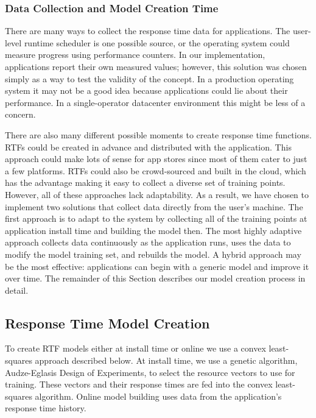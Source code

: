 %
%
%


\subsubsection*{Data Collection and Model Creation Time}
There are many ways to collect the response time data for
applications. The user-level runtime scheduler is one possible source,
or the operating system could measure progress using performance
counters.  In our implementation, applications report their own
measured values; however, this solution was chosen simply as a way to
test the validity of the concept.  In a production operating system it
may not be a good idea because applications could lie about their
performance.  In a single-operator datacenter environment this might be less of a concern.

There are also many different possible moments to create response time functions.  RTFs could be created in advance and distributed with the application. This approach could make lots of sense for app stores since most of them cater to just a few platforms. RTFs could also be crowd-sourced and built in the cloud, which has the advantage making it easy to collect a diverse set of training points.  However, all of these approaches lack adaptability.  As a result, we have chosen to implement two solutions that collect data directly from the user's machine.  The first approach is to adapt to the system by collecting all of the training points at application install time and building the model then.  The most highly adaptive approach collects data continuously as the application runs, uses the data to modify the model training set, and rebuilds the model.  A hybrid approach may be the most effective: applications can begin with a generic model and improve it over time. The remainder of this Section describes our model creation process in detail.
\subsection{Response Time Model Creation}
To create RTF models either at install time or online we use a convex
least-squares approach described below.  At install time, we use a
genetic algorithm, Audze-Eglasis Design of
Experiments\cite{bates-aes03}, to select the resource vectors to use
for training.  These vectors and their response times are fed into the
convex least-squares algorithm. Online model building uses data
from the application's response time history.

